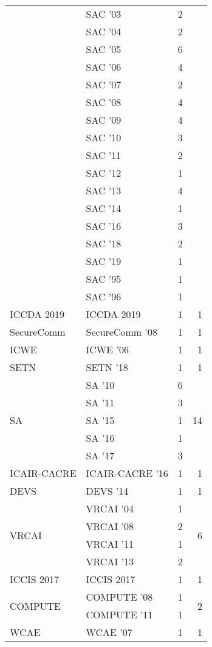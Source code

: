 \begin{table*}[t]
\begin{tabular}{llrr}
& SAC '03 & 2 &\\
& SAC '04 & 2 &\\
& SAC '05 & 6 &\\
& SAC '06 & 4 &\\
& SAC '07 & 2 &\\
& SAC '08 & 4 &\\
& SAC '09 & 4 &\\
& SAC '10 & 3 &\\
& SAC '11 & 2 &\\
& SAC '12 & 1 &\\
& SAC '13 & 4 &\\
& SAC '14 & 1 &\\
& SAC '16 & 3 &\\
& SAC '18 & 2 &\\
& SAC '19 & 1 &\\
& SAC '95 & 1 &\\
& SAC '96 & 1 &\\
\multirow{1}{*}{ICCDA 2019} & ICCDA 2019 & 1 & \multirow{1}{*}{1}\\
\multirow{1}{*}{SecureComm } & SecureComm '08 & 1 & \multirow{1}{*}{1}\\
\multirow{1}{*}{ICWE } & ICWE '06 & 1 & \multirow{1}{*}{1}\\
\multirow{1}{*}{SETN } & SETN '18 & 1 & \multirow{1}{*}{1}\\
\multirow{5}{*}{SA } & SA '10 & 6 & \multirow{5}{*}{14}\\
& SA '11 & 3 &\\
& SA '15 & 1 &\\
& SA '16 & 1 &\\
& SA '17 & 3 &\\
\multirow{1}{*}{ICAIR-CACRE } & ICAIR-CACRE '16 & 1 & \multirow{1}{*}{1}\\
\multirow{1}{*}{DEVS } & DEVS '14 & 1 & \multirow{1}{*}{1}\\
\multirow{4}{*}{VRCAI } & VRCAI '04 & 1 & \multirow{4}{*}{6}\\
& VRCAI '08 & 2 &\\
& VRCAI '11 & 1 &\\
& VRCAI '13 & 2 &\\
\multirow{1}{*}{ICCIS 2017} & ICCIS 2017 & 1 & \multirow{1}{*}{1}\\
\multirow{2}{*}{COMPUTE } & COMPUTE '08 & 1 & \multirow{2}{*}{2}\\
& COMPUTE '11 & 1 &\\
\multirow{1}{*}{WCAE } & WCAE '07 & 1 & \multirow{1}{*}{1}\\

\end{tabular}
\end{table*}
